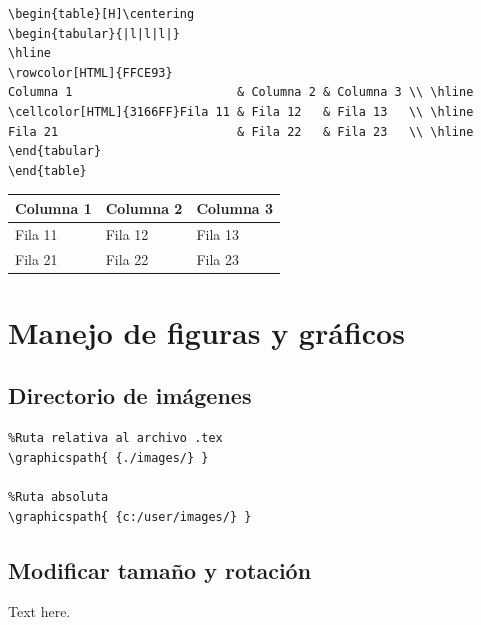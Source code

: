 \documentclass[letterpaper, 10pt, journal]{IEEEtran}
\begin{document}
\lstset{language=Java}
\begin{lstlisting}
\begin{table}[H]\centering
\begin{tabular}{|l|l|l|}
\hline
\rowcolor[HTML]{FFCE93} 
Columna 1                       & Columna 2 & Columna 3 \\ \hline
\cellcolor[HTML]{3166FF}Fila 11 & Fila 12   & Fila 13   \\ \hline
Fila 21                         & Fila 22   & Fila 23   \\ \hline
\end{tabular}
\end{table}
\end{lstlisting}

\begin{table}[H]\centering
\begin{tabular}{|l|l|l|}
\hline
\rowcolor[HTML]{FFCE93} 
Columna 1                       & Columna 2 & Columna 3 \\ \hline
\cellcolor[HTML]{3166FF}Fila 11 & Fila 12   & Fila 13   \\ \hline
Fila 21                         & Fila 22   & Fila 23   \\ \hline
\end{tabular}
\end{table}

\section{Manejo de figuras y gr\'aficos}
\subsection{Directorio de im\'agenes}
\lstset{language=Java}
\begin{lstlisting}
%Ruta relativa al archivo .tex 
\graphicspath{ {./images/} }

%Ruta absoluta
\graphicspath{ {c:/user/images/} }
\end{lstlisting}

\subsection{Modificar tama\~no y rotaci\'on}
Text here.\\
\end{document}
